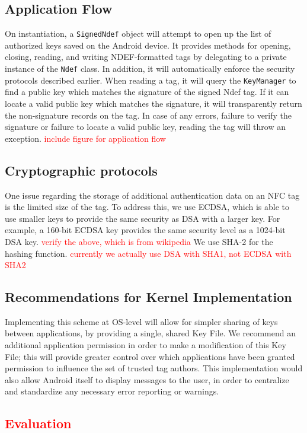 \documentclass[12pt]{article}
\newcommand\TODO[1]{\textcolor{red}{#1}}
\begin{document}
\subsection{Application Flow}
On instantiation, a \texttt{SignedNdef} object will attempt to open up the list of authorized keys saved on the Android device.
It provides methods for opening, closing, reading, and writing NDEF-formatted tags by delegating to a private instance of the \texttt{Ndef} class.
In addition, it will automatically enforce the security protocols described earlier.
When reading a tag, it will query the \texttt{KeyManager} to find a public key which matches the signature of the signed Ndef tag.
If it can locate a valid public key which matches the signature, it will transparently return the non-signature records on the tag.
In case of any errors, failure to verify the signature or failure to locate a valid public key, reading the tag will throw an exception.
\TODO{include figure for application flow}

\subsection{Cryptographic protocols}
One issue regarding the storage of additional authentication data on an NFC tag is the limited size of the tag.
To address this, we use ECDSA, which is able to use smaller keys to provide the same security as DSA with a larger key.
For example, a 160-bit ECDSA key provides the same security level as a 1024-bit DSA key.
\TODO{verify the above, which is from wikipedia}
We use SHA-2 for the hashing function.
\TODO{currently we actually use DSA with SHA1, not ECDSA with SHA2}

\subsection{Recommendations for Kernel Implementation}
Implementing this scheme at OS-level will allow for simpler sharing of keys between applications, by providing a single, shared Key File.
We recommend an additional application permission in order to make a modification of this Key File; this will provide greater control over which applications have been granted permission to influence the set of trusted tag authors.
This implementation would also allow Android itself to display messages to the user, in order to centralize and standardize any necessary error reporting or warnings.

\TODO{\section{Evaluation}}
\end{document}
